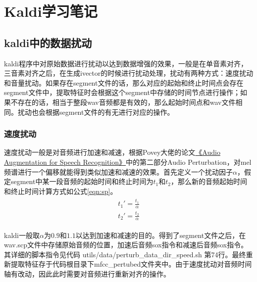 \chapter{Kaldi学习笔记}
\section{kaldi中的数据扰动}
kaldi程序中对原始数据进行扰动以达到数据增强的效果，一般是在单音素对齐，三音素对齐之后，在生成ivector的时候进行扰动处理，扰动有两种方式：速度扰动和音量扰动。如果存在segment文件的话，那么对应的起始和终止时间点会存在segment文件中，提取特征时会根据这个segment中存储的时间节点进行操作；如果不存在的话，相当于整段wav音频都是有效的，那么起始时间点和wav文件相同。扰动也会根据segment文件的有无进行对应的操作。

\subsection{速度扰动}

速度扰动一般是对音频进行加速和减速，根据Povey大佬的论文\href{https://www.danielpovey.com/files/2015_interspeech_augmentation.pdf}{《Audio Augmentation for Speech Recognition》}中的第二部分Audio Perturbation，对mel频谱进行一个偏移就能得到类似加速和减速的效果。首先定义一个扰动因子$\alpha$，假定segment中某一段音频的起始时间和终止时间为$t_1$和$t_2$，那么新的音频起始时间和终止时间计算方式如公式\ref{eqn:sp}。
\begin{align}
\label{eqn:sp}
\begin{split}
  t_{1}' = \frac{t_1}{\alpha} \\
  t_{2}' = \frac{t_2}{\alpha}
\end{split}
\end{align}

kaldi一般取$\alpha$为$0.9$和$1.1$以达到加速和减速的目的。得到了segment文件之后，在wav.scp文件中存储原始音频的位置，加速后音频sox指令和减速后音频sox指令。其详细的脚本指令见代码 utils/data/perturb\_data\_dir\_speed.sh 第74行。最终重新提取特征存于代码根目录下mfcc\_pertubed文件夹中。由于速度扰动对音频时间轴有改动，因此此时需要对音频进行重新对齐的操作。

